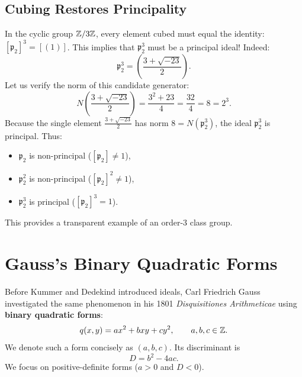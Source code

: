 \documentclass[a4paper]{article}
\begin{document}
\subsection{Cubing Restores Principality}
In the cyclic group $\mathbb{Z}/3\mathbb{Z}$, every element cubed must equal the identity: $[\mathfrak{p}_2]^3 = [(1)]$. This implies that $\mathfrak{p}_2^3$ must be a principal ideal!
Indeed:
\begin{equation}
 \mathfrak{p}_2^3 = \left(\frac{3 + \sqrt{-23}}{2}\right).
\end{equation}
Let us verify the norm of this candidate generator:
\begin{equation}
 N\left(\frac{3 + \sqrt{-23}}{2}\right) = \frac{3^2 + 23}{4} = \frac{32}{4} = 8 = 2^3.
\end{equation}
Because the single element $\frac{3 + \sqrt{-23}}{2}$ has norm $8 = N(\mathfrak{p}_2^3)$, the ideal $\mathfrak{p}_2^3$ is principal. Thus:
\begin{itemize}
 \item $\mathfrak{p}_2$ is non-principal ($[\mathfrak{p}_2] \ne 1$),
 \item $\mathfrak{p}_2^2$ is non-principal ($[\mathfrak{p}_2]^2 \ne 1$),
 \item $\mathfrak{p}_2^3$ is principal ($[\mathfrak{p}_2]^3 = 1$).
\end{itemize}
This provides a transparent example of an order-$3$ class group.

\section{Gauss's Binary Quadratic Forms}
Before Kummer and Dedekind introduced ideals, Carl Friedrich Gauss investigated the same phenomenon in his 1801 \emph{Disquisitiones Arithmeticae} using \textbf{binary quadratic forms}:
\begin{equation}
 q(x, y) = ax^2 + bxy + cy^2, \qquad a, b, c \in \mathbb{Z}.
\end{equation}
We denote such a form concisely as $(a, b, c)$. Its discriminant is
\begin{equation}
 D = b^2 - 4ac.
\end{equation}
We focus on positive-definite forms ($a > 0$ and $D < 0$).
\end{document}
